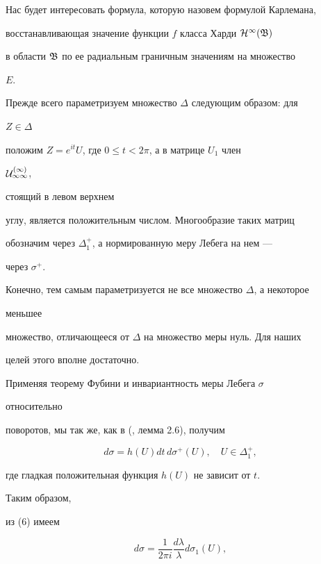 Нас будет интересовать формула, которую назовем формулой Карлемана, 


восстанавливающая значение функции $f$ класса Харди $\cal H^1(\frak B)$ 


в области $\frak B$ по ее радиальным граничным значениям на множество 


$E$. 


 


Прежде всего параметризуем множество $\Delta$ следующим образом: для 


$Z\in\Delta$ 


положим $Z=e^{it}U$, где $0\le t<2\pi$, а в матрице $U_1$ член 


$\cal U^{(1)}_{11}$, 


стоящий в левом верхнем 


углу, является положительным числом. Многообразие таких матриц 


обозначим через $\Delta^+_1$, а нормированную меру Лебега на нем --- 


через $\sigma^+$. 


Конечно, тем самым параметризуется не все множество $\Delta$, а некоторое


меньшее 


множество, отличающееся от $\Delta$ на множество меры нуль. Для наших 


целей этого вполне достаточно. 


 


Применяя теорему Фубини и инвариантность меры Лебега $\sigma$ 


относительно 


поворотов, мы так же, как в (\cite{1}, лемма 2.6), получим 


\begin{equation} 


d\sigma=h(U)dt\,d\sigma^+(U),\quad U\in\Delta^+_1, 


\end{equation} 


где гладкая положительная функция $h(U)$ не зависит от $t$. 


Таким образом, 


из (6) имеем 


\begin{equation} 


d\sigma=\frac{1}{2\pi i}\frac{d\lambda}{\lambda} 


d\sigma_1(U), 


\end{equation} 


